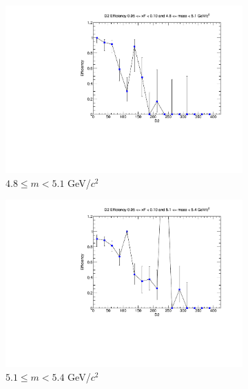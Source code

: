 \documentclass[11pt]{article}
\begin{document}
\begin{figure}[p]
\begin{subfigure}[b]{0.32\textwidth}
        \includegraphics[width=\textwidth]{./kTrackerEfficiencyPlots/D2_Efficiency_xF1_mass2.pdf}
        \caption{$4.8 \leq m < 5.1$ GeV/$c^2$}
    \end{subfigure}\vspace{0.5cm}
    \begin{subfigure}[b]{0.32\textwidth}
        \centering
        \includegraphics[width=\textwidth]{./kTrackerEfficiencyPlots/D2_Efficiency_xF1_mass3.pdf}
        \caption{$5.1 \leq m < 5.4$ GeV/$c^2$}
    \end{subfigure}\hfill
    \begin{subfigure}[b]{0.32\textwidth}
        \centering

\end{subfigure}
\end{figure}
\end{document}
